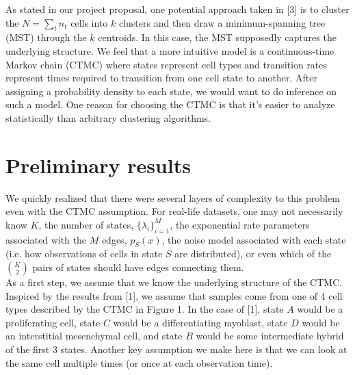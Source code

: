 \documentclass[11pt,onecolumn]{article}
\begin{document}
As stated in our project proposal, one potential approach taken in [3] is to cluster the $N = \sum_{t} n_t$ cells into $k$ clusters and then draw a minimum-spanning tree (MST) through the $k$ centroids. In this case, the MST supposedly captures the underlying structure. We feel that a more intuitive model is a continuous-time Markov chain (CTMC) where states represent cell types and transition rates represent times required to transition from one cell state to another. After assigning a probability density to each state, we would want to do inference on such a model. One reason for choosing the CTMC is that it's easier to analyze statistically than arbitrary clustering algorithms. 
 

\section{Preliminary results}
We quickly realized that there were several layers of complexity to this problem even with the CTMC assumption. For real-life datasets, one may not necessarily know $K$, the number of states, $\{\lambda_i\}_{i=1}^M$, the exponential rate parameters associated with the $M$ edges, $p_S(x)$, the noise model associated with each state (i.e. how observations of cells in state $S$ are distributed), or even which of the $K \choose 2$ pairs of states should have edges connecting them. \\

As a first step, we assume that we know the underlying structure of the CTMC. Inspired by the results from [1], we assume that samples come from one of 4 cell types described by the CTMC in Figure 1. In the case of [1], state $A$ would be a proliferating cell, state $C$ would be a differentiating myoblast, state $D$ would be an interstitial mesenchymal cell, and state $B$ would be some intermediate hybrid of the first 3 states. Another key assumption we make here is that we can look at the same cell multiple times (or once at each observation time).
\end{document}
